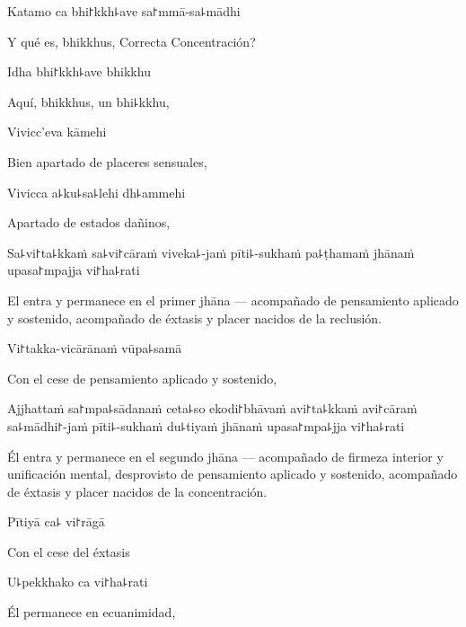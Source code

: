 Katamo ca bhi꜓kkh꜕ave sa꜓mmā-sa꜕mādhi

\begin{english}
	Y qué es, bhikkhus, Correcta Concentración?
\end{english}

Idha bhi꜓kkh꜕ave bhikkhu

\begin{english}
	Aquí, bhikkhus, un bhi꜕kkhu,
\end{english}

Vivicc'eva kāmehi

\begin{english}
	Bien apartado de placeres sensuales,
\end{english}

Vivicca a꜕ku꜕sa꜕lehi dh꜕ammehi

\begin{english}
	Apartado de estados dañinos,
\end{english}

Sa꜕vi꜓ta꜕kkaṁ sa꜕vi꜓cāraṁ viveka꜕-jaṁ pīti꜕-sukhaṁ pa꜕ṭhamaṁ jhānaṁ upasa꜓mpajja vi꜓ha꜕rati

\begin{english}
	El entra y permanece en el primer jhāna --- acompañado de pensamiento aplicado y sostenido, acompañado de éxtasis y placer nacidos de la reclusión.
\end{english}

Vi꜓takka-vicārānaṁ vūpa꜕samā

\begin{english}
	Con el cese de pensamiento aplicado y sostenido,
\end{english}

Ajjhattaṁ sa꜓mpa꜕sādanaṁ ceta꜕so ekodi꜓bhāvaṁ avi꜓ta꜕kkaṁ avi꜓cāraṁ sa꜕mādhi꜓-jaṁ pīti꜕-sukhaṁ du꜕tiyaṁ jhānaṁ upasa꜓mpa꜕jja vi꜓ha꜕rati

\begin{english}
	Él entra y permanece en el segundo jhāna  --- acompañado de firmeza interior y unificación mental, desprovisto de pensamiento aplicado y sostenido, acompañado de éxtasis y placer nacidos de la concentración.
\end{english}

Pītiyā ca꜕ vi꜓rāgā

\begin{english}
	Con el cese del éxtasis
\end{english}

U꜕pekkhako ca vi꜓ha꜕rati

\begin{english}
	Él permanece en ecuanimidad,
\end{english}

